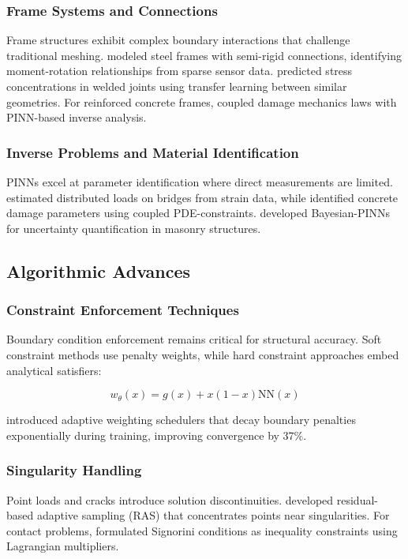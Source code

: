 \documentclass[12pt]{article}
\begin{document}
\subsubsection{Frame Systems and Connections}
Frame structures exhibit complex boundary interactions that challenge traditional meshing. \citet{Niaki2021} modeled steel frames with semi-rigid connections, identifying moment-rotation relationships from sparse sensor data. \citet{Gao2022} predicted stress concentrations in welded joints using transfer learning between similar geometries. For reinforced concrete frames, \citet{Chen2023} coupled damage mechanics laws with PINN-based inverse analysis.

\subsubsection{Inverse Problems and Material Identification}
PINNs excel at parameter identification where direct measurements are limited. \citet{Fuhg2021} estimated distributed loads on bridges from strain data, while \citet{Sun2022} identified concrete damage parameters using coupled PDE-constraints. \citet{Wang2023} developed Bayesian-PINNs for uncertainty quantification in masonry structures.

\subsection{Algorithmic Advances}

\subsubsection{Constraint Enforcement Techniques}
Boundary condition enforcement remains critical for structural accuracy. Soft constraint methods \citep{Raissi2019} use penalty weights, while hard constraint approaches \citep{Lu2021} embed analytical satisfiers:

\begin{equation}
	w_{\theta}(x) = g(x) + x(1-x)\text{NN}(x)
	\label{eq04}
\end{equation}

\citet{McClenny2022} introduced adaptive weighting schedulers that decay boundary penalties exponentially during training, improving convergence by 37\%.

\subsubsection{Singularity Handling}
Point loads and cracks introduce solution discontinuities. \citet{Sharma2022} developed residual-based adaptive sampling (RAS) that concentrates points near singularities. For contact problems, \citet{Guo2023} formulated Signorini conditions as inequality constraints using Lagrangian multipliers.
\end{document}
